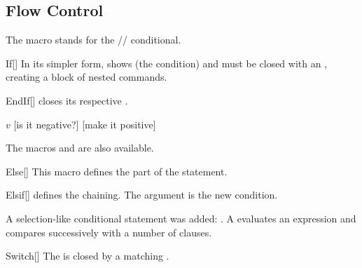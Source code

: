 \documentclass[a4paper, 11pt]{article}
\begin{document}
\subsection{Flow Control}\label{sec:flow-control}
The macro  stands for the // conditional.

\begin{macro}{If}[]
    In its simpler form,  shows  (the condition) and must be closed with an , creating a block of nested commands.

    \BlockOptionsText
\end{macro}

\begin{macro}{EndIf}[]
     closes its respective .

    \MacroOptionsText
\end{macro}

\begin{tcblisting}{}
    \begin{algorithmic}
        \State \Read $v$
        [is it negative?]
            [make it positive]
        \EndIf
    \end{algorithmic}
\end{tcblisting}

The macros  and  are also available.

\begin{macro}{Else}[]
    This macro defines the  part of the  statement.

    \BlockOptionsText
\end{macro}

\begin{macro}{Elsif}[]
     defines the  chaining. The argument  is the new condition.

    \BlockOptionsText
\end{macro}

A selection-like conditional statement was added: . A  evaluates an expression and compares successively with a number of  clauses.

\begin{macro}{Switch}[]
    The  is closed by a matching .

    \BlockOptionsText
\end{macro}
\end{document}
